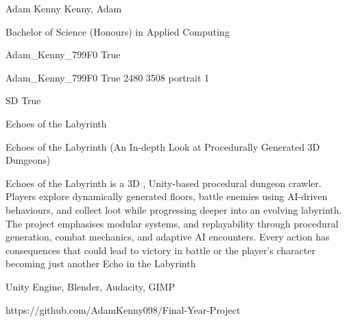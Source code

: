 \documentclass[twoside]{report}
\begin{document}
\begingroup{}\relax



\def\Key{Adam_Kenny_799F0}

{Adam Kenny}
{Kenny, Adam}

{Bachelor of Science (Honours) in Applied Computing}

{Adam_Kenny_799F0}
{True}

{Adam_Kenny_799F0}
{True}
{2480}
{3508}
{portrait}
{1}

{SD}
{True}

{Echoes of the Labyrinth}

{Echoes of the Labyrinth (An In-depth Look at Procedurally Generated 3D Dungeons)}

{Echoes of the Labyrinth is a 3D , Unity-based procedural dungeon crawler. 
Players explore dynamically generated floors, battle enemies using AI-driven behaviours, and collect loot while progressing deeper into an evolving labyrinth. 
The project emphasises modular systems, and replayability through procedural generation, combat mechanics, and adaptive AI encounters.
Every action has consequences that could lead to victory in battle or the player's character becoming just another Echo in the Labyrinth}

{Unity Engine, Blender, Audacity, GIMP}

{https://github.com/AdamKenny098/Final-Year-Project}
\end{document}
